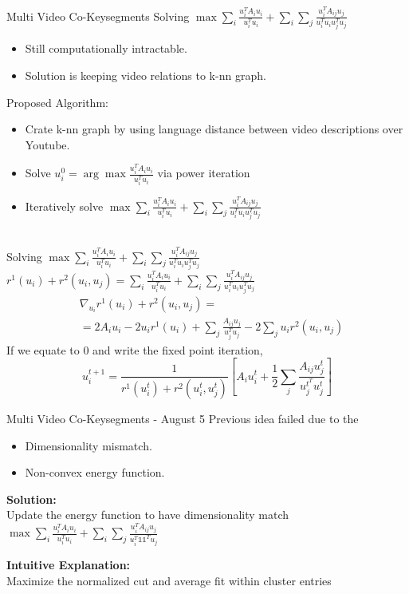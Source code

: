 \begin{frame}{Multi Video Co-Keysegments}
Solving $\max \sum_{i} \frac{u_i^TA_iu_i}{u_i^Tu_i} + \sum_{i}\sum_{j} \frac{u_i^TA_{ij}u_j}{u_i^Tu_iu_j^Tu_j}$
\begin{itemize}
\item Still computationally intractable.
\item Solution is keeping video relations to k-nn graph.
\end{itemize}
Proposed Algorithm:
\begin{itemize}
\item Crate k-nn graph by using language distance between video descriptions over Youtube.
\item Solve $u_i^0 = \arg\max \frac{u_i^TA_iu_i}{u_i^Tu_i}$ via power iteration
\item Iteratively solve $\max \sum_{i} \frac{u_i^TA_iu_i}{u_i^Tu_i} + \sum_{i}\sum_{j} \frac{u_i^TA_{ij}u_j}{u_i^Tu_iu_j^Tu_j}$
\end{itemize}
\end{frame}

\begin{frame}{\vspace{-8mm}\\Solving $\max \sum_{i} \frac{u_i^TA_iu_i}{u_i^Tu_i} + \sum_{i}\sum_{j} \frac{u_i^TA_{ij}u_j}{u_i^Tu_iu_j^Tu_j}$}
$r^1(u_i)+r^2(u_i,u_j)=\sum_{i} \frac{u_i^TA_iu_i}{u_i^Tu_i} + \sum_{i}\sum_{j} \frac{u_i^TA_{ij}u_j}{u_i^Tu_iu_j^Tu_j}$
\begin{align*}
&\nabla_{u_i} r^1(u_i)+r^2(u_i,u_j) = \\ &= 2A_i u_i - 2u_i r^1(u_i) + \sum_j \frac{A_{ij}u_j}{u_j^Tu_j} - 2\sum_j u_i r^2(u_i,u_j)
\end{align*}
If we equate to $0$ and write the fixed point iteration,
\begin{equation*}
u_i^{t+1} = \frac{1}{r^1(u_i^t)+r^2(u_i^t,u_j^t)}\left[A_iu_i^t+\frac{1}{2}\sum_j \frac{A_{ij}u_j^t}{u_j^{t^T}u_j^t}\right]
\end{equation*}
\end{frame}


\begin{frame}{Multi Video Co-Keysegments - August 5}
Previous idea failed due to the
\begin{itemize}
\item Dimensionality mismatch.
\item Non-convex energy function.
\end{itemize}
{\bf Solution:} \\
Update the energy function to have dimensionality match  \\

$\max \sum_{i} \frac{u_i^TA_iu_i}{u_i^Tu_i} + \sum_{i}\sum_{j} \frac{u_i^TA_{ij}u_j}{u_i^T \mathds{1} \mathds{1}^Tu_j}$

{\bf Intuitive Explanation:} \\
Maximize the normalized cut and average fit within cluster entries
\end{frame}



